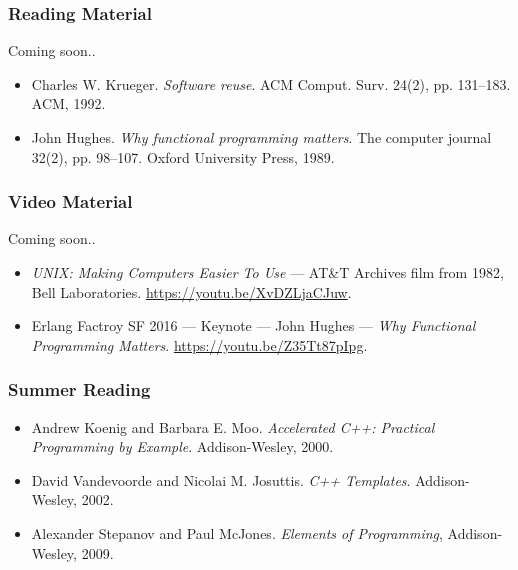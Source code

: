 \begin{frame}

\frametitle{Reading Material}

\begin{center}

Coming soon..

\end{center}

\footnotesize

\begin{itemize}

\item Charles W. Krueger. \emph{Software reuse}. ACM Comput. Surv. 24(2),
pp. 131--183. ACM, 1992.

\item John Hughes. \emph{Why functional programming matters}. The computer
journal 32(2), pp. 98--107. Oxford University Press, 1989.

\end{itemize}

\end{frame}


\begin{frame}

\frametitle{Video Material}

\begin{center}

Coming soon..

\end{center}

\footnotesize

\begin{itemize}

\item \emph{UNIX: Making Computers Easier To Use} --- AT\&T Archives film from
1982, Bell Laboratories. \url{https://youtu.be/XvDZLjaCJuw}.

\item Erlang Factroy SF 2016 --- Keynote --- John Hughes --- \emph{Why
Functional Programming Matters}. \url{https://youtu.be/Z35Tt87pIpg}.

\end{itemize}

\end{frame}


\begin{frame}

\frametitle{Summer Reading}

\footnotesize

\begin{itemize}

\item Andrew Koenig and Barbara E. Moo. \emph{Accelerated C++: Practical
Programming by Example}. Addison-Wesley, 2000.

\item David Vandevoorde and Nicolai M. Josuttis. \emph{C++ Templates}.
Addison-Wesley, 2002.

\item Alexander Stepanov and Paul McJones. \emph{Elements of Programming},
Addison-Wesley, 2009.

\end{itemize}

\end{frame}
